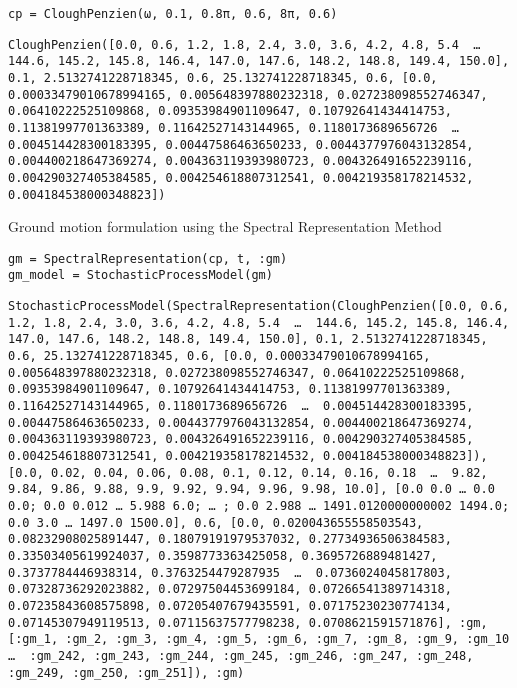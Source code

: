 \begin{verbatim}
cp = CloughPenzien(ω, 0.1, 0.8π, 0.6, 8π, 0.6)
\end{verbatim}


\begin{verbatim}
CloughPenzien([0.0, 0.6, 1.2, 1.8, 2.4, 3.0, 3.6, 4.2, 4.8, 5.4  …  144.6, 145.2, 145.8, 146.4, 147.0, 147.6, 148.2, 148.8, 149.4, 150.0], 0.1, 2.5132741228718345, 0.6, 25.132741228718345, 0.6, [0.0, 0.00033479010678994165, 0.005648397880232318, 0.027238098552746347, 0.06410222525109868, 0.09353984901109647, 0.10792641434414753, 0.11381997701363389, 0.11642527143144965, 0.1180173689656726  …  0.004514428300183395, 0.00447586463650233, 0.0044377976043132854, 0.004400218647369274, 0.004363119393980723, 0.004326491652239116, 0.004290327405384585, 0.004254618807312541, 0.004219358178214532, 0.004184538000348823])
\end{verbatim}



Ground motion formulation using the Spectral Representation Method




\begin{verbatim}
gm = SpectralRepresentation(cp, t, :gm)
gm_model = StochasticProcessModel(gm)
\end{verbatim}


\begin{verbatim}
StochasticProcessModel(SpectralRepresentation(CloughPenzien([0.0, 0.6, 1.2, 1.8, 2.4, 3.0, 3.6, 4.2, 4.8, 5.4  …  144.6, 145.2, 145.8, 146.4, 147.0, 147.6, 148.2, 148.8, 149.4, 150.0], 0.1, 2.5132741228718345, 0.6, 25.132741228718345, 0.6, [0.0, 0.00033479010678994165, 0.005648397880232318, 0.027238098552746347, 0.06410222525109868, 0.09353984901109647, 0.10792641434414753, 0.11381997701363389, 0.11642527143144965, 0.1180173689656726  …  0.004514428300183395, 0.00447586463650233, 0.0044377976043132854, 0.004400218647369274, 0.004363119393980723, 0.004326491652239116, 0.004290327405384585, 0.004254618807312541, 0.004219358178214532, 0.004184538000348823]), [0.0, 0.02, 0.04, 0.06, 0.08, 0.1, 0.12, 0.14, 0.16, 0.18  …  9.82, 9.84, 9.86, 9.88, 9.9, 9.92, 9.94, 9.96, 9.98, 10.0], [0.0 0.0 … 0.0 0.0; 0.0 0.012 … 5.988 6.0; … ; 0.0 2.988 … 1491.0120000000002 1494.0; 0.0 3.0 … 1497.0 1500.0], 0.6, [0.0, 0.020043655558503543, 0.08232908025891447, 0.18079191979537032, 0.27734936506384583, 0.33503405619924037, 0.3598773363425058, 0.3695726889481427, 0.3737784446938314, 0.3763254479287935  …  0.0736024045817803, 0.07328736292023882, 0.07297504453699184, 0.07266541389714318, 0.07235843608575898, 0.07205407679435591, 0.07175230230774134, 0.07145307949119513, 0.07115637577798238, 0.0708621591571876], :gm, [:gm_1, :gm_2, :gm_3, :gm_4, :gm_5, :gm_6, :gm_7, :gm_8, :gm_9, :gm_10  …  :gm_242, :gm_243, :gm_244, :gm_245, :gm_246, :gm_247, :gm_248, :gm_249, :gm_250, :gm_251]), :gm)
\end{verbatim}



